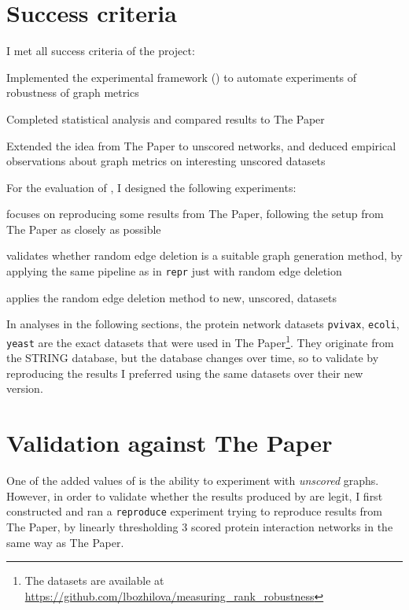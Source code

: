 \section{Success criteria}

I met all success criteria of the project:
\begin{todolist}
    \item[\done] Implemented the experimental framework (\graffs) to automate experiments of robustness of graph metrics
    \item[\done] Completed statistical analysis and compared results to The Paper
    \item[\done] Extended the idea from The Paper to unscored networks, and deduced empirical observations about graph metrics on interesting unscored datasets
\end{todolist}

For the evaluation of \graffs, I designed the following experiments:
\begin{description}[itemsep=\zerospace]
    \item[\texttt{reproduce}] focuses on reproducing some results from The Paper, following the setup from The Paper as closely as possible
    \item[\texttt{random-edges}] validates whether random edge deletion is a suitable graph generation method, by applying the same pipeline as in \texttt{repr} just with random edge deletion
    \item[\texttt{unscored}] applies the random edge deletion method to new, unscored, datasets
\end{description}

In analyses in the following sections, the protein network datasets \texttt{pvivax}, \texttt{ecoli}, \texttt{yeast} are the exact datasets that were used in The Paper\footnote{The datasets are available at \url{https://github.com/lbozhilova/measuring_rank_robustness}}.
They originate from the STRING database, but the database changes over time, so to validate \graffs by reproducing the results I preferred using the same datasets over their new version.


\section{Validation against The Paper}

One of the added values of \graffs is the ability to experiment with \textsl{unscored} graphs.
However, in order to validate whether the results produced by \graffs are legit, I first constructed and ran a \texttt{reproduce} experiment trying to reproduce results from The Paper, by linearly thresholding 3 scored protein interaction networks in the same way as The Paper.

